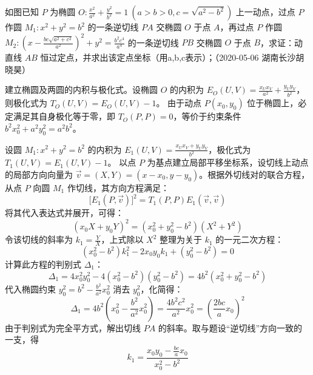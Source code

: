 \begin{exercise}
如图已知 \(P\) 为椭圆 \(O: \frac{x^2}{a^2} + \frac{y^2}{b^2} = 1\ (a > b > 0, c = \sqrt{a^2 - b^2})\) 上一动点，过点 \(P\) 作圆 \(M_1: x^2 + y^2 = b^2\) 的一条逆切线 \(PA\) 交椭圆 \(O\) 于点 \(A\)，再过点 \(P\) 作圆$M_2: \left(x - \frac{bc\sqrt{a^2 + c^2}}{a^2}\right)^2 + y^2 = \frac{b^2c^4}{a^4}$
的一条逆切线 \(PB\) 交椭圆 \(O\) 于点 \(B\)，求证：动直线 \(AB\) 恒过定点，并求出该定点坐标（用a,b,c表示）；（2020-05-06 湖南长沙胡晓昊）
\end{exercise}
\begin{solution}
建立椭圆及两圆的内积与极化式。设椭圆 $O$ 的内积为 $E_O(U, V) = \frac{x_U x_V}{a^2} + \frac{y_U y_V}{b^2}$，则极化式为 $T_O(U, V) = E_O(U, V) - 1$。
由于动点 $P(x_0, y_0)$ 位于椭圆上，必定满足其自身极化等于零，即 $T_O(P,P) = 0$，等价于约束条件 $b^2 x_0^2 + a^2 y_0^2 = a^2 b^2$。

设圆 $M_1: x^2 + y^2 = b^2$ 的内积为 $E_1(U, V) = \frac{x_U x_V + y_U y_V}{b^2}$，极化式为 $T_1(U, V) = E_1(U, V) - 1$。
以点 $P$ 为基点建立局部平移坐标系，设切线上动点的局部方向向量为 $\vec{v} = (X, Y) = (x - x_0, y - y_0)$。根据外切线对的联合方程，从点 $P$ 向圆 $M_1$ 作切线，其方向方程满足：
\[ \big[E_1(P, \vec{v})\big]^2 = T_1(P, P) E_1(\vec{v}, \vec{v}) \]
将其代入表达式并展开，可得：
\[ (x_0 X + y_0 Y)^2 = (x_0^2 + y_0^2 - b^2)(X^2 + Y^2) \]
令该切线的斜率为 $k_1 = \frac{Y}{X}$，上式除以 $X^2$ 整理为关于 $k_1$ 的一元二次方程：
\[ (x_0^2 - b^2) k_1^2 - 2x_0 y_0 k_1 + (y_0^2 - b^2) = 0 \]
计算此方程的判别式 $\Delta_1$：
\[ \Delta_1 = 4x_0^2 y_0^2 - 4(x_0^2 - b^2)(y_0^2 - b^2) = 4b^2(x_0^2 + y_0^2 - b^2) \]
代入椭圆约束 $y_0^2 = b^2 - \frac{b^2}{a^2}x_0^2$ 消去 $y_0^2$，化简得：
\[ \Delta_1 = 4b^2\left( x_0^2 - \frac{b^2}{a^2}x_0^2 \right) = \frac{4b^2 c^2}{a^2} x_0^2 = \left( \frac{2bc}{a} x_0 \right)^2 \]
由于判别式为完全平方式，解出切线 $PA$ 的斜率。取与题设“逆切线”方向一致的一支，得
\[ k_1 = \frac{x_0 y_0 - \frac{bc}{a} x_0}{x_0^2 - b^2} \]


\end{solution}
